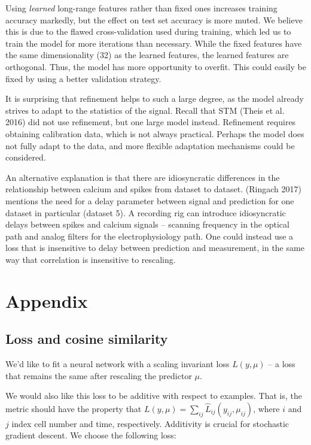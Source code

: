 \documentclass[]{article}
\begin{document}
Using \emph{learned} long-range features rather than fixed ones
increases training accuracy markedly, but the effect on test set
accuracy is more muted. We believe this is due to the flawed
cross-validation used during training, which led us to train the model
for more iterations than necessary. While the fixed features have the
same dimensionality (32) as the learned features, the learned features
are orthogonal. Thus, the model has more opportunity to overfit. This
could easily be fixed by using a better validation strategy.

It is surprising that refinement helps to such a large degree, as the
model already strives to adapt to the statistics of the signal. Recall
that STM (Theis et al. 2016) did not use refinement, but one large model
instead. Refinement requires obtaining calibration data, which is not
always practical. Perhaps the model does not fully adapt to the data,
and more flexible adaptation mechanisms could be considered.

An alternative explanation is that there are idiosyncratic differences
in the relationship between calcium and spikes from dataset to dataset.
(Ringach 2017) mentions the need for a delay parameter between signal
and prediction for one dataset in particular (dataset 5). A recording
rig can introduce idiosyncratic delays between spikes and calcium
signals -- scanning frequency in the optical path and analog filters for
the electrophysiology path. One could instead use a loss that is
insensitive to delay between prediction and measurement, in the same way
that correlation is insensitive to rescaling.

\section{Appendix}\label{appendix}

\subsection{Loss and cosine
similarity}\label{loss-and-cosine-similarity}

We'd like to fit a neural network with a scaling invariant loss
\(L(y, \mu)\) -- a loss that remains the same after rescaling the
predictor \(\mu\).

We would also like this loss to be additive with respect to examples.
That is, the metric should have the property that
\(L(y, \mu) = \sum_{ij} \hat L_{ij}(y_{ij}, \mu_{ij})\), where \(i\) and
\(j\) index cell number and time, respectively. Additivity is crucial
for stochastic gradient descent. We choose the following loss:
\end{document}

